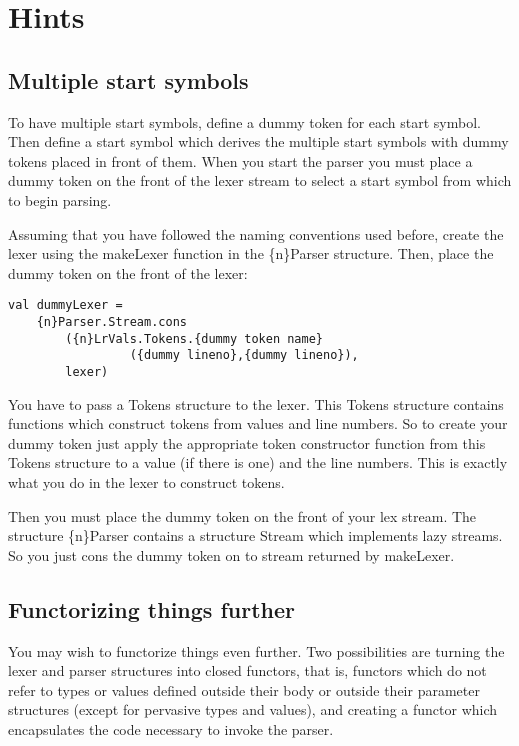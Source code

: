 \documentclass{article}
\begin{document}
\section{Hints}
\subsection{Multiple start symbols}
To have multiple start symbols, define a dummy token for each
start symbol.  Then define a start symbol which derives the
multiple start symbols with dummy tokens placed in front of
them.  When you start the parser you must place a dummy token
on the front of the lexer stream to select a start symbol
from which to begin parsing.

Assuming that you have followed the naming conventions used before,
create the lexer using the makeLexer function in the \{n\}Parser structure.
Then, place the dummy token on the front of the lexer:
\begin{tt}
\begin{verbatim}
val dummyLexer =
    {n}Parser.Stream.cons
        ({n}LrVals.Tokens.{dummy token name}
                 ({dummy lineno},{dummy lineno}),
        lexer)
\end{verbatim}
\end{tt}
   You have to pass a Tokens structure to the lexer.  This Tokens structure
contains functions which construct tokens from values and line numbers.
So to create your dummy token just apply the appropriate token constructor
function from this Tokens structure to a value (if there is one) and the
line numbers.   This is exactly what you do in the lexer to construct tokens.

   Then you must place the dummy token on the front of your lex stream.
The structure \{n\}Parser contains a structure Stream which implements
lazy streams.  So you just cons the dummy token on to stream returned
by makeLexer.
\subsection{Functorizing things further}

You may wish to functorize things even further.  Two possibilities
are turning the lexer and parser structures into closed functors,
that is, functors which do not refer to types or values defined
outside their body or outside their parameter structures (except
for pervasive types and values), and creating a functor which
encapsulates the code necessary to invoke the parser.
\end{document}
